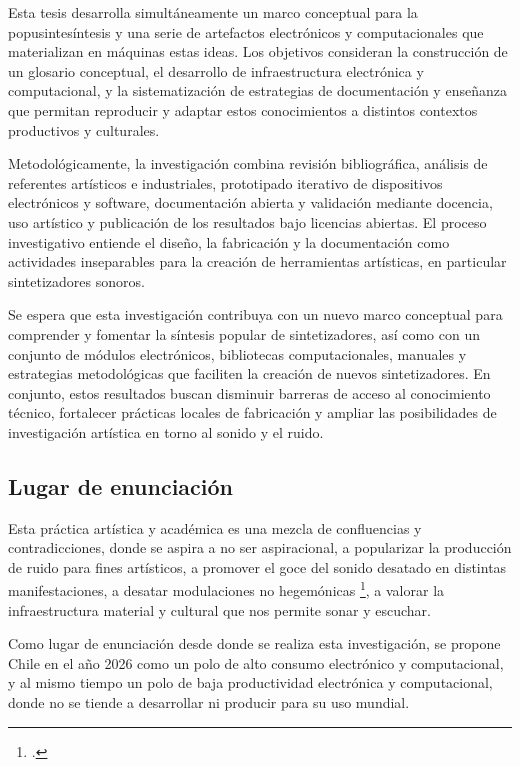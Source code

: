 \documentclass[../proyecto.tex]{subfiles}
\begin{document}

Esta tesis desarrolla simultáneamente un marco conceptual para la popusintesíntesis y una serie de artefactos electrónicos y computacionales que materializan en máquinas estas ideas. Los objetivos consideran la construcción de un glosario conceptual, el desarrollo de infraestructura electrónica y computacional, y la sistematización de estrategias de documentación y enseñanza que permitan reproducir y adaptar estos conocimientos a distintos contextos productivos y culturales.


Metodológicamente, la investigación combina revisión bibliográfica, análisis de referentes artísticos e industriales, prototipado iterativo de dispositivos electrónicos y software, documentación abierta y validación mediante docencia, uso artístico y publicación de los resultados bajo licencias abiertas. El proceso investigativo entiende el diseño, la fabricación y la documentación como actividades inseparables para la creación de herramientas artísticas, en particular sintetizadores sonoros.


Se espera que esta investigación contribuya con un nuevo marco conceptual para comprender y fomentar la síntesis popular de sintetizadores, así como con un conjunto de módulos electrónicos, bibliotecas computacionales, manuales y estrategias metodológicas que faciliten la creación de nuevos sintetizadores. En conjunto, estos resultados buscan disminuir barreras de acceso al conocimiento técnico, fortalecer prácticas locales de fabricación y ampliar las posibilidades de investigación artística en torno al sonido y el ruido.

\subsection{Lugar de enunciación}

Esta práctica artística y académica es una mezcla de confluencias y contradicciones, donde se aspira a no ser aspiracional, a popularizar la producción de ruido para fines artísticos, a promover el goce del sonido desatado en distintas manifestaciones, a desatar modulaciones no hegemónicas \footcite{mendivil_contra_2023}, a valorar la infraestructura material y cultural que nos permite sonar y escuchar.

Como lugar de enunciación desde donde se realiza esta investigación, se propone Chile en el año 2026 como un polo de alto consumo electrónico y computacional, y al mismo tiempo un polo de baja productividad electrónica y computacional, donde no se tiende a desarrollar ni producir para su uso mundial.
\end{document}
